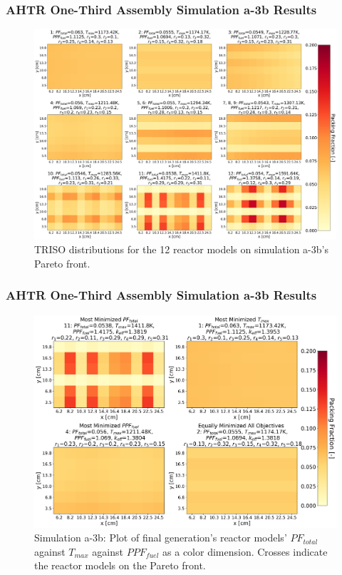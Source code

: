 \begin{frame}
    \frametitle{AHTR One-Third Assembly Simulation a-3b Results}
    \begin{figure}
        \includegraphics[width=0.8\linewidth]{../docs/figures/assem-obj-3-all-distr.png} 
        \caption{TRISO distributions for the 12 reactor models on simulation 
        a-3b's Pareto front.}
    \end{figure}
\end{frame}

\begin{frame}
    \frametitle{AHTR One-Third Assembly Simulation a-3b Results}
    \begin{figure}
        \includegraphics[width=0.8\linewidth]{../docs/figures/assem-obj-3-all-distr-most-minimized.png} 
        \caption{Simulation a-3b: Plot of final generation's reactor models' 
        $PF_{total}$ against $T_{max}$ against $PPF_{fuel}$ as a color dimension. 
        Crosses indicate the reactor models on the Pareto front.}
    \end{figure}
\end{frame}

